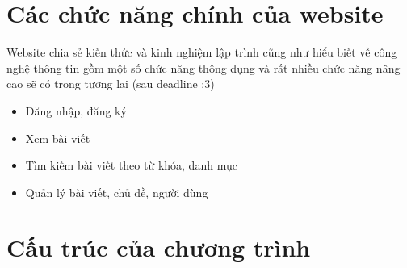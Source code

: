 \documentclass{article}
\begin{document}
\section*{Các chức năng chính của website} %

Website chia sẻ kiến thức và kinh nghiệm lập trình cũng như hiểu biết về công nghệ thông tin gồm một số chức năng thông dụng và rất nhiều chức năng nâng cao sẽ có trong tương lai (sau deadline :3)

\begin{itemize}
\item Đăng nhập, đăng ký
\item Xem bài viết
\item Tìm kiếm bài viết theo từ khóa, danh mục
\item Quản lý bài viết, chủ đề, người dùng
\end{itemize}
\newpage
\section*{Cấu trúc của chương trình}
\end{document}
